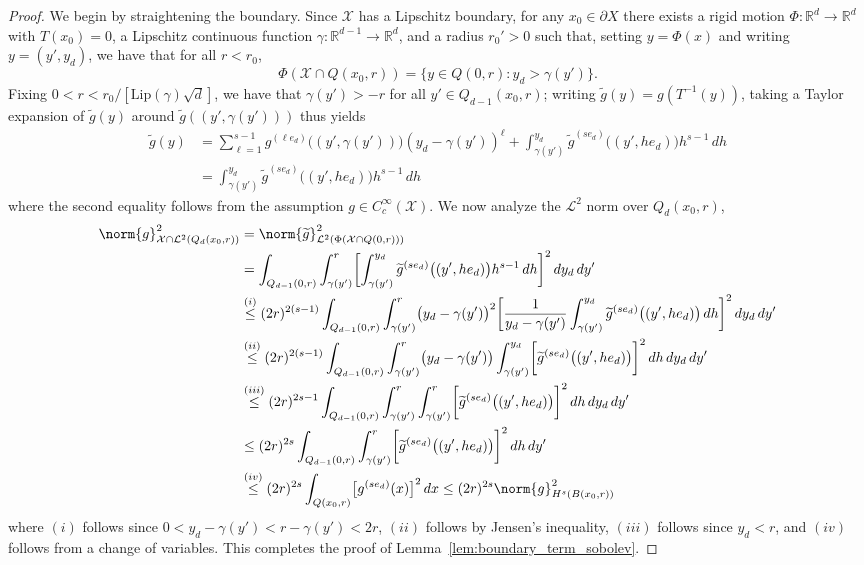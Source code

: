 \documentclass{article}
\newcommand{\Reals}{\mathbb{R}}
\newcommand{\1}{\mathbf{1}}
\newcommand{\Rd}{\Reals^d}
\newcommand{\Xset}{\mathcal{X}}
\newcommand{\Leb}{\mathcal{L}}
\newcommand{\wt}[1]{\widetilde{#1}}
\theoremstyle{alden}
\theoremstyle{aldenthm}
\theoremstyle{definition}
\theoremstyle{remark}
\begin{document}
\begin{proof}
	We begin by straightening the boundary. Since $\Xset$ has a Lipschitz boundary, for any $x_0 \in \partial X$ there exists a rigid motion $\Phi: \Rd \to \Rd$ with $T(x_0) = 0$, a Lipschitz continuous function $\gamma: \Reals^{d-1} \to \Reals^d$, and a radius $r_0' > 0$ such that, setting $y = \Phi(x)$ and writing $y = (y',y_d)$, we have that for all $r < r_0$,
	\begin{equation*}
	\Phi(\Xset \cap Q(x_0,r)) = \bigl\{y \in Q(0,r): y_d > \gamma(y')\bigr\}.
	\end{equation*}
	Fixing $0 < r < r_0/[\mathrm{Lip}(\gamma)\sqrt{d}]$, we have that $\gamma(y') > -r$ for all $y' \in Q_{d - 1}(x_0,r)$; writing $\wt{g}(y) = g(T^{-1}(y))$, taking a Taylor expansion of $\wt{g}(y)$ around $\wt{g}((y',\gamma(y')))$ thus yields
	\begin{align*}
	\wt{g}(y) & = \sum_{\ell = 1}^{s - 1} g^{(\ell e_d)}\bigl((y',\gamma(y'))\bigr) (y_d - \gamma(y'))^{\ell} + \int_{\gamma(y')}^{y_d} \wt{g}^{(se_d)}\bigl((y',he_d)\bigr) h^{s - 1}\,dh \\
	& = \int_{\gamma(y')}^{y_d} \wt{g}^{(se_d)}\bigl((y',he_d)\bigr) h^{s - 1}\,dh
	\end{align*}
	where the second equality follows from the assumption $g \in C_c^{\infty}(\Xset)$. We now analyze the $\Leb^2$ norm over $Q_d(x_0,r)$,
	\begin{align*}
	\norm{g}_{\Xset \cap \Leb^2(Q_d(x_0,r))}^2 & = \norm{\wt{g}}_{\Leb^2(\Phi(\Xset \cap Q(0,r)))}^2 \\
	& = \int_{Q_{d - 1}(0,r)} \int_{\gamma(y')}^{r} \biggl[\int_{\gamma(y')}^{y_d} \wt{g}^{(se_d)}\bigl((y',he_d)\bigr)h^{s - 1} \,dh\biggr]^2 \,dy_d \,dy' \\
	& \overset{(i)}{\leq} (2r)^{2(s - 1)} \int_{Q_{d - 1}(0,r)} \int_{\gamma(y')}^{r} \bigl(y_d - \gamma(y')\bigr)^2 \biggl[\frac{1}{y_d - \gamma(y')}\int_{\gamma(y')}^{y_d} \wt{g}^{(se_d)}\bigl((y',he_d)\bigr) \,dh\biggr]^2 \,dy_d \,dy' \\
	& \overset{(ii)}{\leq}  (2r)^{2(s - 1)} \int_{Q_{d - 1}(0,r)} \int_{\gamma(y')}^{r} \bigl(y_d - \gamma(y')\bigr) \int_{\gamma(y')}^{y_d} \biggl[\wt{g}^{(se_d)}\bigl((y',he_d)\bigr)\biggr]^2 \,dh \,dy_d \,dy' \\
	& \overset{(iii)}{\leq}  (2r)^{2s - 1} \int_{Q_{d - 1}(0,r)} \int_{\gamma(y')}^{r} \int_{\gamma(y')}^{r} \biggl[\wt{g}^{(se_d)}\bigl((y',he_d)\bigr)\biggr]^2 \,dh \,dy_d \,dy' \\
	& \leq  (2r)^{2s} \int_{Q_{d - 1}(0,r)}  \int_{\gamma(y')}^{r} \biggl[\wt{g}^{(se_d)}\bigl((y',he_d)\bigr)\biggr]^2 \,dh  \,dy' \\
	& \overset{(iv)}{\leq} (2r)^{2s} \int_{Q(x_0,r)} \bigl[g^{(se_d)}(x)\bigr]^2 \,dx \leq (2r)^{2s} \norm{g}_{H^s(B(x_0,r))}^2
	\end{align*} 
	where $(i)$ follows since $0 < y_d - \gamma(y') < r - \gamma(y') < 2r$, $(ii)$ follows by Jensen's inequality, $(iii)$ follows since $y_d < r$, and $(iv)$ follows from a change of variables. This completes the proof of Lemma~\ref{lem:boundary_term_sobolev}.
\end{proof}
\end{document}
